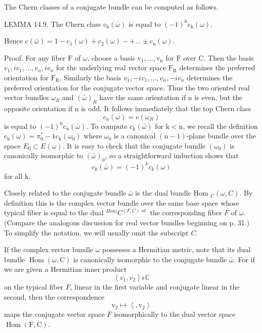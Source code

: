 \documentclass[10pt]{article}
\begin{document}
The Chern classes of a conjugate bundle can be computed as follows.

LEMMA 14.9. The Chern class $\mathrm{c}_{\mathrm{k}}(\bar{\omega})$ is equal to $(-1)^{\mathrm{k}} \mathrm{c}_{\mathrm{k}}(\omega)$.

Hence $\mathrm{c}(\bar{\omega})=1-\mathrm{c}_{1}(\omega)+\mathrm{c}_{2}(\omega)-+\ldots \pm \mathrm{c}_{\mathrm{n}}(\omega)$.

Proof. For any fiber $\mathrm{F}$ of $\omega$, choose a basis $\mathrm{v}_{1}, \ldots, \mathrm{v}_{\mathrm{n}}$ for $\mathrm{F}$ over C. Then the basis $v_{1}, i v_{1}, \ldots, v_{n}, i v_{n}$ for the underlying real vector space $\mathrm{F}_{\mathrm{R}}$ determines the preferred orientation for $\mathrm{F}_{\mathrm{R}}$. Similarly the basis $v_{1},-i v_{1}, \ldots, v_{n},-i v_{n}$ determines the preferred orientation for the conjugate vector space. Thus the two oriented real vector bundles $\omega_{R}$ and $(\bar{\omega})_{R}$ have the same orientation if $\mathrm{n}$ is even, but the opposite orientation if $\mathrm{n}$ is odd. It follows immediately that the top Chern class
$$
c_{n}(\omega)=e\left(\omega_{R}\right)
$$
is equal to $(-1)^{\mathrm{n}} \mathrm{c}_{\mathrm{n}}(\bar{\omega})$. To compute $\mathrm{c}_{\mathrm{k}}(\bar{\omega})$ for $\mathrm{k}<\mathrm{n}$, we recall the definition $\mathrm{c}_{\mathrm{k}}(\omega)=\pi_{0}^{*}-1 \mathrm{c}_{\mathrm{k}}\left(\omega_{0}\right)$ where $\omega_{0}$ is a canonical $(\mathrm{n}-1)$-plane bundle over the space $E_{0} \subset E(\omega)$. It is easy to check that the conjugate bundle $\overline{\left(\omega_{0}\right)}$ is canonically isomorphic to $(\bar{\omega})_{0}$, so a straightforward induction shows that
$$
c_{k}(\bar{\omega})=(-1)^{k} c_{k}(\omega)
$$
for all $\mathrm{k}$.

Closely related to the conjugate bundle $\bar{\omega}$ is the dual bundle Hom $_{C}(\omega, C)$. By definition this is the complex vector bundle over the same base space whose typical fiber is equal to the dual ${ }^{H o m} C^{(F, C) \text { of }}$ the corresponding fiber $F$ of $\omega$. (Compare the analogous discussion for real vector bundles beginning on p. 31.) To simplify the notation, we will usually omit the subscript $C$.

If the complex vector bundle $\omega$ possesses a Hermitian metric, note that its dual bundle $\operatorname{Hom}(\omega, \mathrm{C})$ is canonically isomorphic to the conjugate bundle $\bar{\omega} .$ For if we are given a Hermitian inner product
$$
\left\langle v_{1}, v_{2}\right\rangle \epsilon \mathbb{C}
$$
on the typical fiber $F$, linear in the first variable and conjugate linear in the second, then the correspondence
$$
\mathrm{v}_{2} \mapsto\left\langle, \mathrm{v}_{2}\right\rangle
$$
maps the conjugate vector space $\bar{F}$ isomorphically to the dual vector space $\operatorname{Hom}(\mathrm{F}, \mathrm{C})$.
\end{document}
